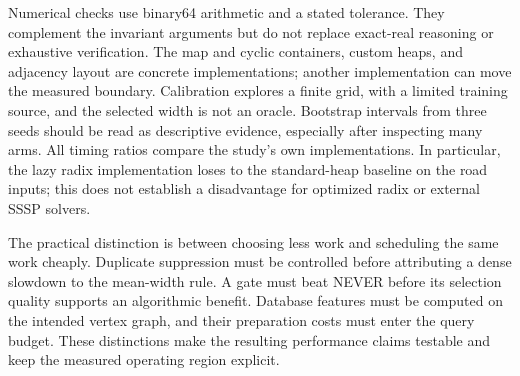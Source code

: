 \documentclass[11pt]{article}
\begin{document}
Numerical checks use binary64 arithmetic and a stated tolerance. They complement
the invariant arguments but do not replace exact-real reasoning or exhaustive
verification. The map and cyclic containers, custom heaps, and adjacency layout
are concrete implementations; another implementation can move the measured
boundary. Calibration explores a finite grid, with a limited training source,
and the selected width is not an oracle. Bootstrap intervals from three seeds
should be read as descriptive evidence, especially after inspecting many arms.
All timing ratios compare the study's own implementations. In particular, the
lazy radix implementation loses to the standard-heap baseline on the road inputs;
this does not establish a disadvantage for optimized radix or external SSSP solvers.

The practical distinction is between choosing less work and scheduling the same
work cheaply. Duplicate suppression must be controlled before attributing a
dense slowdown to the mean-width rule. A gate must beat NEVER before its selection
quality supports an algorithmic benefit. Database features must be computed on
the intended vertex graph, and their preparation costs must enter the query
budget. These distinctions make the resulting performance claims testable and
keep the measured operating region explicit.

\appendix
\end{document}
